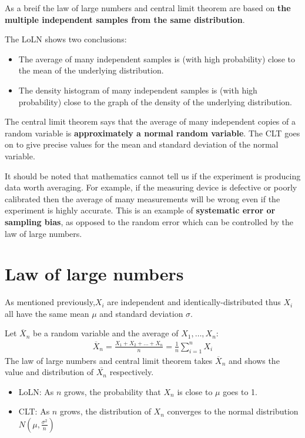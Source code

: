 \documentclass[10pt,a4paper]{article}
\begin{document}
As a breif   the law of large numbers and central limit theorem are based on \textbf{the multiple
independent samples from the same distribution}. 

The LoLN shows two conclusions:
\begin{itemize}
	\item The average of many independent samples is (with high probability) close to the mean of the
	underlying distribution.
	\item The density histogram of many independent samples is (with high probability) close to the graph of the density of the underlying distribution.
\end{itemize}

The central limit theorem says that the average of many independent copies of a random
variable is \textbf{approximately a normal random variable}. The CLT goes on to give precise values for the
mean and standard deviation of the normal variable.

It should be noted that mathematics cannot tell us if the experiment is producing data worth
averaging. For example, if the measuring device is defective or poorly calibrated then the average
of many measurements will be wrong even if the experiment is highly accurate. This  is  an  example
of \textbf{systematic error or sampling bias}, as opposed to the random error which can be
controlled by the law of large numbers.

\pagebreak
\section{Law of large numbers}

As mentioned previously,$X_i$ are independent and identically-distributed thus $X_i$ all have the
same mean $\mu$ and standard deviation $\sigma$.

Let $\overline{X}_n$ be a random variable and the average of $X_1,\dots,X_n$:
\begin{align*}
	\overline{X}_n = \frac{X_1+X_2+\dots+X_n}{n} = \frac{1}{n}\sum_{i=1}^n X_i
\end{align*}
The law of large numbers and central limit theorem takes $\overline{X}_n$ and shows the value
and distribution of $\overline{X_n}$ respectively.
\begin{itemize}
	\item LoLN: As $n$ grows, the probability that $X_n$ is close to $\mu$ goes to 1.
	\item CLT: As $n$ grows, the distribution of $X_n$ converges to the normal distribution
	$N(\mu,\frac{\sigma^2}{n})$
\end{itemize}
\end{document}
